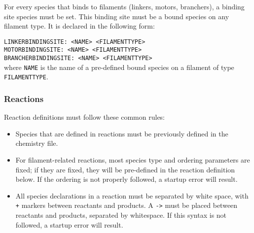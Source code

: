 \documentclass[11pt, oneside]{article}   	%
\begin{document}
For every species that binds to filaments (linkers, motors, branchers), a binding site species must be set. This binding site must be a bound species on any filament type. It is declared in the following form: \newline

\noindent\texttt{LINKERBINDINGSITE: <NAME> <FILAMENTTYPE>}\\
\texttt{MOTORBINDINGSITE: <NAME> <FILAMENTTYPE>}\\
\texttt{BRANCHERBINDINGSITE: <NAME> <FILAMENTTYPE>}\\

\noindent where \texttt{NAME} is the name of a pre-defined bound species on a filament of type \texttt{FILAMENTTYPE}.

\subsubsection{Reactions}

Reaction definitions must follow these common rules:
\begin{itemize}
\item Species that are defined in reactions must be previously defined in the chemistry file. 
\item For filament-related reactions, most species type and ordering parameters are fixed; if they are fixed, they will be pre-defined in the reaction definition below. If the ordering is not properly followed, a startup error will result. 
\item All species declarations in a reaction must be separated by white space, with \texttt{+} markers between reactants and products. A \texttt{->} must be placed between reactants and products, separated by whitespace. If this syntax is not followed, a startup error will result.
\end{itemize}
\end{document}
